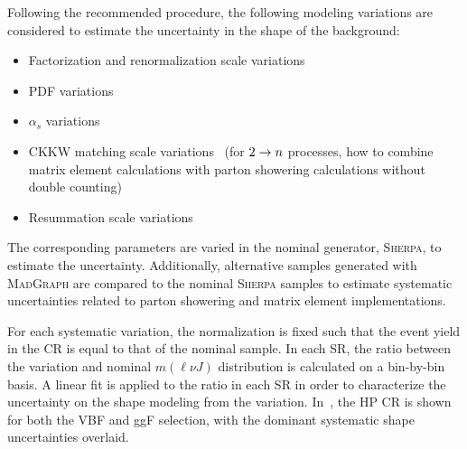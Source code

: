 Following the recommended procedure, the following modeling variations are considered to estimate the uncertainty in the shape of the \Wjets background:
\begin{itemize}
\item Factorization and renormalization scale variations
\item PDF variations
\item $\alpha_s$ variations
\item CKKW matching scale variations~\cite{ckkw} (for $2\rightarrow n$ processes, how to combine matrix element calculations with parton showering calculations without double counting)
\item Resummation scale variations
\end{itemize}
The corresponding parameters are varied in the nominal generator, \textsc{Sherpa}, to estimate the uncertainty. Additionally, alternative samples generated with \textsc{MadGraph} are compared to the nominal \textsc{Sherpa} samples to estimate systematic uncertainties related to parton showering and matrix element implementations.

For each systematic variation, the normalization is fixed such that the event yield in the \Wjets CR is equal to that of the nominal sample. In each SR, the ratio between the variation and nominal $m(\ell\nu J)$ distribution is calculated on a bin-by-bin basis. A linear fit is applied to the ratio in each SR in order to characterize the uncertainty on the shape modeling from the variation. In~\Fig{\ref{fig:wj_syst}}, the HP \Wjets CR is shown for both the VBF and ggF selection, with the dominant systematic shape uncertainties overlaid.

